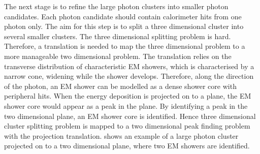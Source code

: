 The next stage is to refine the large photon clusters into smaller photon candidates. Each photon candidate should contain calorimeter hits from one photon only. The aim for  this step is to split a three dimensional cluster into several smaller clusters. The three dimensional splitting problem is hard. Therefore, a translation is needed to map the three dimensional problem to a more manageable two dimensional problem. The translation relies on the  transverse distribution of characteristic EM showers, which is characterised by a narrow cone, widening while the shower develops. Therefore, along the direction of the photon, an  EM shower can be modelled as a dense shower core with peripheral hits. When the energy deposition is projected on to a plane, the EM shower core would appear as a peak in the plane. By identifying a peak in the two dimensional plane, an EM shower core is identified.  Hence three dimensional cluster splitting problem is mapped to a two dimensional peak finding problem with the projection translation.  shows an example of a large photon cluster projected on to a two dimensional plane, where two EM showers are identified.






